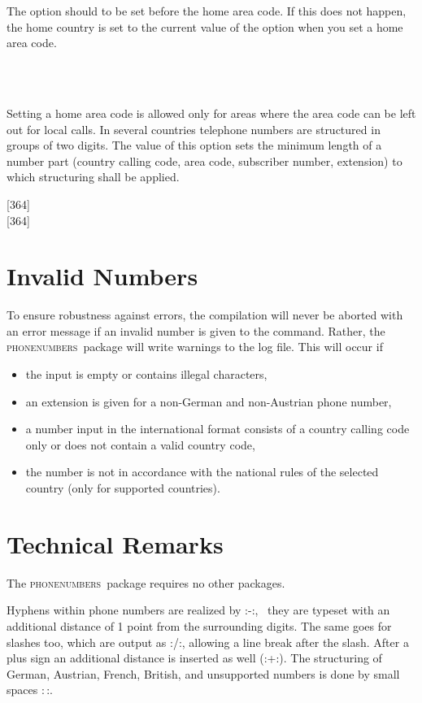 \documentclass[numbers=noenddot]{scrreprt}
\newcommand*\Paket[1]{\textsc{#1}}
\newcommand\phone{\textcolor{cnltx}{\Paket{phone\-numbers}}}
\newcommand\UeberschriftUngueltig{\section{Invalid Numbers}}
\begin{document}
\begin{Befehlsliste}
The  option should to be set before the home area code. If this does not happen, the home country is set to the current value of the  option when you set a home area code.
\begin{sidebyside}
   \\
   \\
\end{sidebyside}
Setting a home area code is allowed only for areas where the area code can be left out for local calls.
In several countries telephone numbers are structured in groups of two digits. The value of this option sets the minimum length of a number part (country calling code, area code, subscriber number, extension) to which structuring shall be applied.
\begin{sidebyside}
  [364] \\
  [364]
\end{sidebyside}
\end{Befehlsliste}

\UeberschriftUngueltig
To ensure robustness against errors, the compilation will never be aborted with an error message if an invalid number is given to the  command. Rather, the \phone\ package will write warnings to the log file.
This will occur if
\begin{itemize}
\item the input is empty or contains illegal characters,
\item an extension is given for a non-German and non-Austrian phone number,
\item a number input in the international format consists of a country calling code only or does not contain a valid country code,
\item the number is not in accordance with the national rules of the selected country (only for supported countries).
\end{itemize}

\section{Technical Remarks}
The \phone\ package requires no other packages.

Hyphens within phone numbers are realized by
\verbcode:\kern1pt-\kern1pt:, \ie\ they are typeset with an additional distance of 1 point from the surrounding digits. The same goes for slashes too, which are output as
\verbcode:\kern1pt\slash\kern1pt:, allowing a line break after the slash. After a plus sign an additional distance is inserted as well
(\verbcode:+\kern1pt:).
The structuring of German, Austrian, French, British, and unsupported numbers is done by small spaces
\verbcode:\,:.
\end{document}
